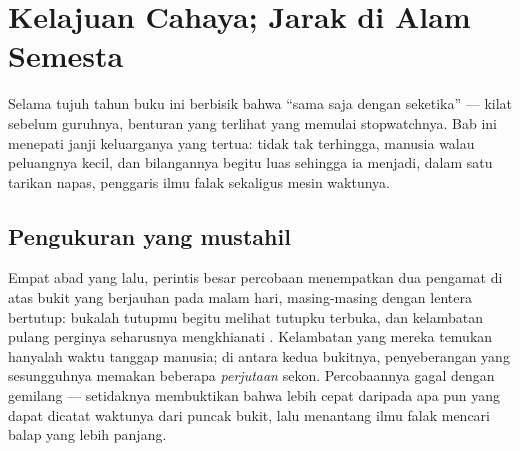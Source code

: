 \chapter{Kelajuan Cahaya; Jarak di Alam Semesta}\label{ch:g8:speed-of-light}

Selama tujuh tahun buku ini berbisik bahwa  ``sama saja dengan
seketika'' --- kilat sebelum guruhnya, benturan yang terlihat yang
memulai stopwatchnya. Bab ini menepati janji keluarganya yang tertua:
  tidak tak terhingga, manusia  walau
peluangnya kecil, dan bilangannya begitu luas sehingga ia menjadi,
dalam satu tarikan napas, penggaris ilmu falak sekaligus mesin
waktunya.

\section{Pengukuran yang mustahil}

\begin{example}\label{ex:g8:speed-of-light:galileo}
Empat abad yang lalu, perintis besar percobaan menempatkan dua
pengamat di atas bukit yang berjauhan pada malam hari, masing-masing
dengan lentera bertutup: bukalah tutupmu begitu melihat tutupku
terbuka, dan kelambatan pulang perginya seharusnya mengkhianati
 . Kelambatan yang mereka temukan hanyalah waktu tanggap
manusia; di antara kedua bukitnya, penyeberangan  yang
sesungguhnya memakan beberapa \emph{perjutaan} sekon. Percobaannya
gagal dengan gemilang --- setidaknya membuktikan bahwa  lebih
cepat daripada apa pun yang dapat dicatat waktunya dari puncak bukit,
lalu menantang ilmu falak mencari  balap yang lebih panjang.
\end{example}


